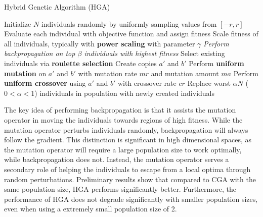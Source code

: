 \begin{algorithm}[h]
\caption{Hybrid Genetic Algorithm (HGA)}
\label{alg:hga}
\begin{algorithmic}
\STATE Initialize $N$ individuals randomly by uniformly sampling values from $[-r, r]$
	\STATE Evaluate each individual with objective function and assign fitness
	\STATE Scale fitness of all individuals, typically with \textbf{power scaling} with parameter $\gamma$
	\STATE \textit{Perform backpropagation on top $\beta$ individuals with highest fitness}
	\STATE Select existing individuals via \textbf{roulette selection}
		\STATE Create copies $a'$ and $b'$
		\STATE Perform \textbf{uniform mutation} on $a'$ and $b'$ with mutation rate $mr$ and mutation amount $ma$
		\STATE Perform \textbf{uniform crossover} using $a'$ and $b'$ with crossover rate $cr$
	\ENDFOR
	\STATE Replace worst $\alpha N$ ($0< \alpha < 1$) individuals in population with newly created individuals
\ENDFOR
\end{algorithmic}
\end{algorithm}

The key idea of performing backpropagation is that it assists the mutation operator in moving the individuals towards regions of high fitness. While the mutation operator perturbs individuals randomly, backpropagation will always follow the gradient. This distinction is significant in high dimensional spaces, as the mutation operator will require a large population size to work optimally, while backpropagation does not. Instead, the mutation operator serves a secondary role of helping the individuals to escape from a local optima through random perturbations. Preliminary results show that compared to CGA with the same population size, HGA performs significantly better. Furthermore, the performance of HGA does not degrade significantly with smaller population sizes, even when using a extremely small population size of 2. 